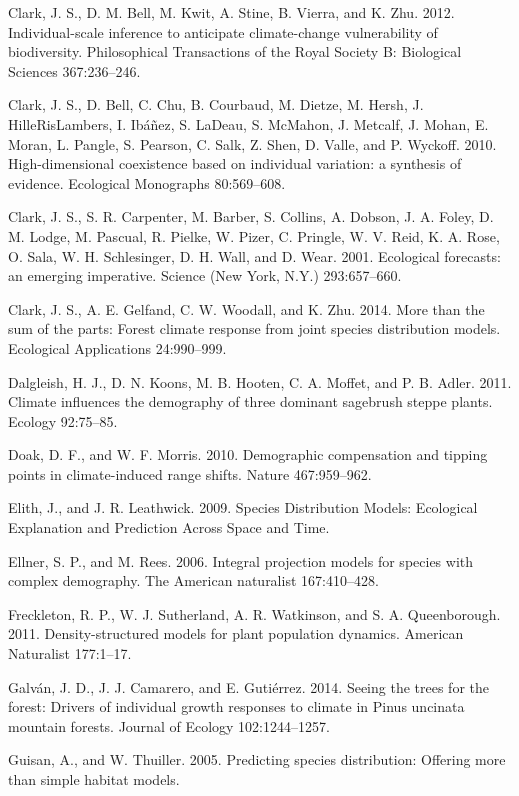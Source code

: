 \documentclass[12pt,]{article}
\begin{document}
Clark, J. S., D. M. Bell, M. Kwit, A. Stine, B. Vierra, and K. Zhu.
2012. Individual-scale inference to anticipate climate-change
vulnerability of biodiversity. Philosophical Transactions of the Royal
Society B: Biological Sciences 367:236--246.

Clark, J. S., D. Bell, C. Chu, B. Courbaud, M. Dietze, M. Hersh, J.
HilleRisLambers, I. Ibáñez, S. LaDeau, S. McMahon, J. Metcalf, J. Mohan,
E. Moran, L. Pangle, S. Pearson, C. Salk, Z. Shen, D. Valle, and P.
Wyckoff. 2010. High-dimensional coexistence based on individual
variation: a synthesis of evidence. Ecological Monographs 80:569--608.

Clark, J. S., S. R. Carpenter, M. Barber, S. Collins, A. Dobson, J. A.
Foley, D. M. Lodge, M. Pascual, R. Pielke, W. Pizer, C. Pringle, W. V.
Reid, K. A. Rose, O. Sala, W. H. Schlesinger, D. H. Wall, and D. Wear.
2001. Ecological forecasts: an emerging imperative. Science (New York,
N.Y.) 293:657--660.

Clark, J. S., A. E. Gelfand, C. W. Woodall, and K. Zhu. 2014. More than
the sum of the parts: Forest climate response from joint species
distribution models. Ecological Applications 24:990--999.

Dalgleish, H. J., D. N. Koons, M. B. Hooten, C. A. Moffet, and P. B.
Adler. 2011. Climate influences the demography of three dominant
sagebrush steppe plants. Ecology 92:75--85.

Doak, D. F., and W. F. Morris. 2010. Demographic compensation and
tipping points in climate-induced range shifts. Nature 467:959--962.

Elith, J., and J. R. Leathwick. 2009. Species Distribution Models:
Ecological Explanation and Prediction Across Space and Time.

Ellner, S. P., and M. Rees. 2006. Integral projection models for species
with complex demography. The American naturalist 167:410--428.

Freckleton, R. P., W. J. Sutherland, A. R. Watkinson, and S. A.
Queenborough. 2011. Density-structured models for plant population
dynamics. American Naturalist 177:1--17.

Galván, J. D., J. J. Camarero, and E. Gutiérrez. 2014. Seeing the trees
for the forest: Drivers of individual growth responses to climate in
Pinus uncinata mountain forests. Journal of Ecology 102:1244--1257.

Guisan, A., and W. Thuiller. 2005. Predicting species distribution:
Offering more than simple habitat models.
\end{document}
